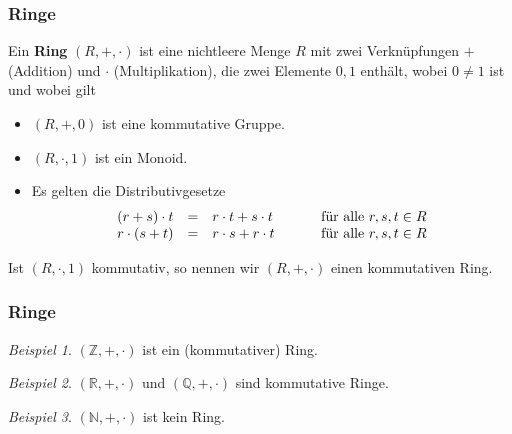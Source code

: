 \documentclass[hyperref={pdfpagelabels=false}]{beamer}
\theoremstyle{plain}%
\theoremstyle{definition}
\theoremstyle{remark}
\newtheorem*{beispiel}{Beispiel}
\def \N{\mathbb N}
\def \Z{\mathbb Z}
\begin{document}
\begin{frame}
\frametitle{Ringe}

\begin{definition} Ein \textbf{Ring} $(R, + , \cdot)$ ist eine nichtleere Menge $R$ mit 
zwei Verknüpfungen $+$ (Addition) und $\cdot$ (Multiplikation), 
die zwei Elemente $0, 1$ enthält, wobei $0 \neq 1$ ist und wobei gilt

\begin{itemize}
\item $(R, +, 0)$ ist eine kommutative Gruppe.
\item $(R, \cdot, 1)$ ist ein Monoid.
\item Es gelten die Distributivgesetze
  	$$ \begin{array} {l c l c l}
  	(r + s) \cdot t & = & r \cdot t + s \cdot t & \quad & \textrm{ für alle } r, s, t \in R \\
   	r \cdot (s + t) & = & r \cdot s + r \cdot t & \quad & \textrm{ für alle } r, s, t \in R
  	\end{array} $$
\end{itemize}
  
Ist $(R, \cdot, 1)$ kommutativ, so nennen wir $(R, + , \cdot)$ einen kommutativen Ring.
\end{definition}

\end{frame}

\begin{frame}
\frametitle{Ringe}

\begin{beispiel}
$(\Z, +, \cdot) $ ist ein (kommutativer) Ring. 
\end{beispiel}

\pause 

\begin{beispiel}
$ (\mathbb R, +, \cdot)$ und $(\mathbb Q, +, \cdot)$ sind kommutative Ringe.
\end{beispiel}

\pause 

\begin{beispiel}
$(\N, +, \cdot) $ ist kein Ring. 
\end{beispiel}

\end{frame}
\end{document}
